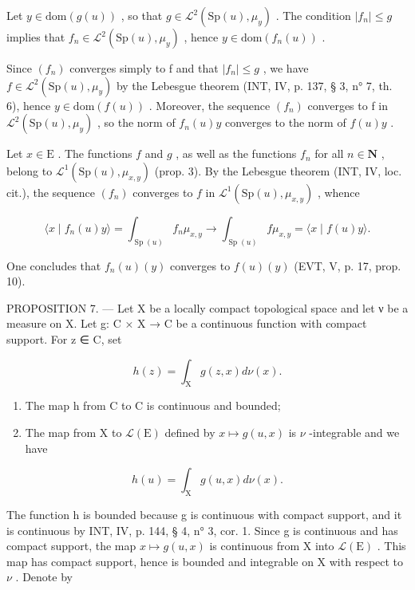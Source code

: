 Let \(y \in \mathrm{dom}(g(u))\) , so that \(g \in \mathcal{L}^2(\mathrm{Sp}(u), \mu_y)\) . The condition \(|f_n| \leqslant g\) implies that \(f_n \in \mathcal{L}^2(\mathrm{Sp}(u), \mu_y)\) , hence \(y \in \mathrm{dom}(f_n(u))\) .

Since \((f_{n})\) converges simply to f and that \(|f_{n}| \leqslant g\) , we have \(f \in \mathcal{L}^{2}(\mathrm{Sp}(u), \mu_{y})\) by the Lebesgue theorem (INT, IV, p. 137, § 3, n° 7, th. 6), hence \(y \in \mathrm{dom}(f(u))\) . Moreover, the sequence \((f_{n})\) converges to f in \(\mathcal{L}^{2}(\mathrm{Sp}(u), \mu_{y})\) , so the norm of \(f_{n}(u)y\) converges to the norm of \(f(u)y\) .

Let \(x \in \mathrm{E}\) . The functions \(f\) and \(g\) , as well as the functions \(f_n\) for all \(n \in \mathbf{N}\) , belong to \(\mathcal{L}^1(\mathrm{Sp}(u), \mu_{x,y})\) (prop. 3). By the Lebesgue theorem (INT, IV, loc. cit.), the sequence \((f_n)\) converges to \(f\) in \(\mathcal{L}^1(\mathrm{Sp}(u), \mu_{x,y})\) , whence

\[
\langle x \mid f _ {n} (u) y \rangle = \int_ {\operatorname{Sp} (u)} f _ {n} \mu_ {x, y} \rightarrow \int_ {\operatorname{Sp} (u)} f \mu_ {x, y} = \langle x \mid f (u) y \rangle .
\]

One concludes that \(f_{n}(u)(y)\) converges to \(f(u)(y)\) (EVT, V, p. 17, prop. 10).

PROPOSITION 7. --- Let X be a locally compact topological space and let ν be a measure on X. Let g: C × X → C be a continuous function with compact support. For z ∈ C, set

\[
h (z) = \int_ {\mathrm{X}} g (z, x) d \nu (x).
\]

\begin{enumerate}
\def\labelenumi{\alph{enumi})}
\item
  The map h from C to C is continuous and bounded;
\item
  The map from X to \(\mathcal{L}(\mathrm{E})\) defined by \(x\mapsto g(u,x)\) is \(\nu\) -integrable and we have
\end{enumerate}

\[
h (u) = \int_ {\mathrm{X}} g (u, x) d \nu (x).
\]

The function h is bounded because g is continuous with compact support, and it is continuous by INT, IV, p. 144, § 4, n° 3, cor. 1. Since g is continuous and has compact support, the map \(x \mapsto g(u, x)\) is continuous from X into \(\mathcal{L}(\mathrm{E})\) . This map has compact support, hence is bounded and integrable on X with respect to \(\nu\) . Denote by

